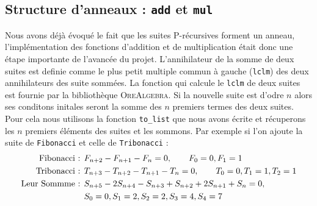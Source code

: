 \documentclass[12pt]{article}
\newlength{\charwidth}
\newcommand{\uline}{\underline{\hspace{2\charwidth}}}
\begin{document}
    \subsection{Structure d'anneaux : \texttt{\uline add\uline } et \texttt{\uline mul\uline}}
        \label{sec:ring}
        Nous avons déjà évoqué le fait que les suites P-récursives forment un anneau,
        l'implémentation des fonctions d'addition et de multiplication était donc une étape
        importante de l'avancée du projet.
        L'annihilateur de la somme de deux suites est definie comme le plus petit 
        multiple commun à gauche (\texttt{lclm}) des deux annihilateurs des suite sommées.
        La fonction qui calcule le \texttt{lclm} de deux suites est fournie par la bibliothèque
        \textsc{OreAlgebra}. 
        Si la nouvelle suite est d'odre $n$ alors ses conditons initales seront la somme des 
        $n$ premiers termes des deux suites. Pour cela nous utilisons la fonction \texttt{to\_list}
        que nous avons écrite
        et récuperons les $n$ premiers éléments des suites et les sommons.
        Par exemple si l'on ajoute la suite de \texttt{Fibonacci} et celle de \texttt{Tribonacci} :
        \begin{align*}
            \textnormal{Fibonacci : } &F_{n+2} - F_{n+1} - F_n = 0,\qquad F_0=0, F_1=1\\
            \textnormal{Tribonacci : } &T_{n+3} - T_{n+2} - T_{n+1} - T_n = 0,\qquad T_0 = 0, T_1 = 1, T_2 = 1\\
            \textnormal{Leur Sommme : } &S_{n+5} - 2S_{n+4} - S_{n+3} + S_{n+2} + 2S_{n+1} + S_n = 0,\\
            &S_0 = 0, S_1 = 2, S_2 = 2, S_3 = 4, S_4 = 7
        \end{align*} 
        
\end{document}
